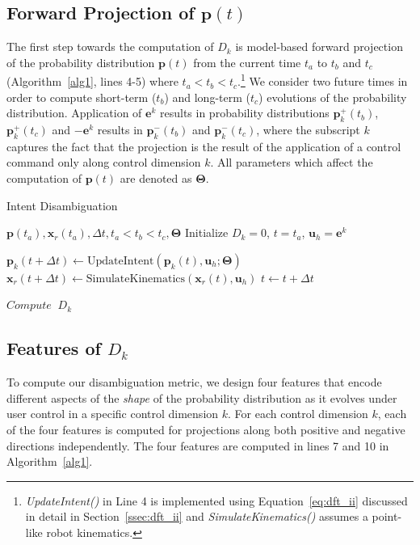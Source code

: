\documentclass[journal]{IEEEtran}
\begin{document}
\subsection{Forward Projection of $\boldsymbol{p}(t)$}\label{ssec:projection}
The first step towards the computation of $D_k$ is model-based forward projection of the probability distribution $\boldsymbol{p}(t)$ from the current time $t_a$ to $t_b$ and $t_c$ (Algorithm~\ref{alg1}, lines 4-5) where $t_a < t_b < t_c$.\footnote{\textit{UpdateIntent()} in Line 4 is implemented using Equation~\ref{eq:dft_ii} discussed in detail in Section~\ref{ssec:dft_ii} and \textit{SimulateKinematics()} assumes a point-like robot kinematics.} We consider two future times in order to compute short-term ($t_b$) and long-term ($t_c$) evolutions of the probability distribution. Application of $\boldsymbol{e}^k$ results in probability distributions $\boldsymbol{p}^+_k(t_b)$, $\boldsymbol{p}^+_k(t_c)$ and $-\boldsymbol{e}^k$ results in $\boldsymbol{p}^-_k(t_b)$ and $\boldsymbol{p}^-_k(t_c)$, where the subscript $k$ captures the fact that the projection is the result of the application of a control command only along control dimension $k$. All parameters which affect the computation of $\boldsymbol{p}(t)$ are denoted as $\boldsymbol{\Theta}$. 
\begin{algorithm}[t]
	\caption{Intent Disambiguation}
	\label{alg1}
	\begin{algorithmic}[1]
		\REQUIRE $\boldsymbol{p}(t_a), \boldsymbol{x}_r(t_a), \Delta t, t_a < t_b < t_c, \boldsymbol{\Theta}$
		\STATE Initialize $D_k = 0$, $t = t_a$, $\boldsymbol{u}_h = \boldsymbol{e}^k$
		
		\STATE $\boldsymbol{p}_k(t + \Delta t) \leftarrow \text{UpdateIntent}(\boldsymbol{p}_k(t), \boldsymbol{u}_h; \boldsymbol{\Theta})$
		\STATE $\boldsymbol{x}_r(t + \Delta t) \leftarrow \text{SimulateKinematics}(\boldsymbol{x}_r(t), \boldsymbol{u}_h)$
		  
		\ENDIF
		  \ENDIF
		\STATE $t \leftarrow t + \Delta t$
		\ENDWHILE
		
		\STATE $Compute \;\;D_k$
		\ENDFOR
		
	\end{algorithmic}
\end{algorithm}

\subsection{Features of $D_k$}\label{ssec:components}
To compute our disambiguation metric, we design four features that encode different aspects of the \textit{shape} of the probability distribution as it evolves under user control in a specific control dimension $k$. For each control dimension $k$, each of the four features is computed for projections along both positive and negative directions independently. The four features are computed in lines 7 and 10 in Algorithm~\ref{alg1}.
\end{document}
